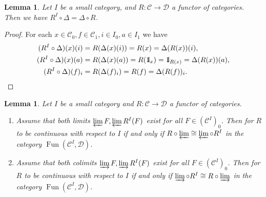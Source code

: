 \documentclass{surv-l}
\numberwithin{equation}{chapter}
\numberwithin{figure}{chapter}
\theoremstyle{plain}
\newtheorem{lem}[thm]{Lemma}
\theoremstyle{definition}
\theoremstyle{remark}
\newcommand{\id}{1\kern-.25em{\text{{\rm l}}}}
\DeclareMathOperator{\Fun}{Fun}
\begin{document}
\begin{lem}\label{lem:De-comm}
Let $I$ be a small category, and $R \colon {\mathcal{C}} \to {\mathcal{D}}$ a functor of categories.
Then we have $R^I\circ \Delta = \Delta \circ R$.
\end{lem}

\begin{proof}
For each $x \in {\mathcal{C}}_0, f \in {\mathcal{C}}_1, i \in I_0, a \in I_1$ we have
\[
\begin{aligned}
(R^I\circ \Delta)(x)(i) &= R(\Delta(x)(i)) = R(x) = \Delta(R(x))(i),\\
(R^I\circ \Delta)(x)(a) &= R(\Delta(x)(a)) = R(\id_x) = \id_{R(x)} =\Delta(R(x))(a),\\
(R^I\circ \Delta)(f)_i &= R(\Delta(f)_i) = R(f) = \Delta(R(f))_i.
\end{aligned}
\]
\end{proof}

\begin{lem}\label{lem:conti-coconti}
Let $I$ be a small category and $R \colon {\mathcal{C}} \to {\mathcal{D}}$ a functor of categories.
\begin{enumerate}
\item
Assume that both limits $\varprojlim F, \varprojlim R^I(F)$ exist for all
$F \in ({\mathcal{C}}^I)_0$.
Then for $R$ to be continuous with respect to $I$ if and only if
$R \circ \varprojlim \cong \varprojlim \circ R^I$ in the category
$\Fun({\mathcal{C}}^I, {\mathcal{D}})$.
\item
Assume that both colimits $\varinjlim F, \varinjlim R^I(F)$ exist for all
$F \in ({\mathcal{C}}^I)_0$.
Then for $R$ to be continuous with respect to $I$ if and only if
$\varinjlim \circ R^I \cong R \circ \varinjlim$ in the category
$\Fun({\mathcal{C}}^I, {\mathcal{D}})$.
\end{enumerate}
\end{lem}
\end{document}
